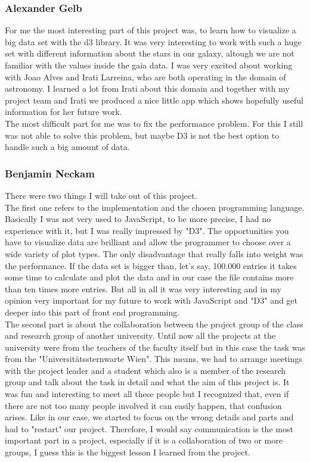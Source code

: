 \documentclass{vgtc}                          %
\begin{document}
\subsubsection{Alexander Gelb}
For me the most interesting part of this project was, to learn how to visualize a big data set with the d3 library. It was very interesting to work with such a huge set with different information about the stars in our galaxy, altough we are not familiar with the values inside the gaia data. I was very excited about working with Joao Alves and Irati Larreina, who are both operating in the domain of astronomy. I learned a lot from Irati about this domain and together with my project team and Irati we produced a nice little app which shows hopefully useful information for her future work. \\
The most difficult part for me was to fix the performance problem. For this I still was not able to solve this problem, but maybe D3 is not the best option to handle such a big amount of data.
\subsubsection{Benjamin Neckam}
There were two things I will take out of this project.\\
The first one refers to the implementation and the chosen programming language. Basically I was not very used to JavaScript, to be more precise, I had no experience with it, but I was really impressed by "D3". The opportunities you have to visualize data are brilliant and allow the programmer to choose over a wide variety of plot types. The only disadvantage that really falls into weight was the performance. If the data set is bigger than, let's say, 100.000 entries it takes some time to calculate and plot the data and in our case the file contains more than ten times more entries. But all in all it was very interesting and in my opinion very important for my future to work with JavaScript and "D3" and get deeper into this part of front end programming.\\
The second part is about the collaboration between the project group of the class and research group of another university. Until now all the projects at the university were from the teachers of the faculty itself but in this case the task was from the "Universitätssternwarte Wien". This means, we had to arrange meetings with the project leader and a student which also is a member of the research group and talk about the task in detail and what the aim of this project is. It was fun and interesting to meet all these people but I recognized that, even if there are not too many people involved it can easily happen, that confusion arises. Like in our case, we started to focus on the wrong details and parts and had to "restart" our project. Therefore, I would say communication is the most important part in a project, especially if it is a collaboration of two or more groups, I guess this is the biggest lesson I learned from the project.
\end{document}
